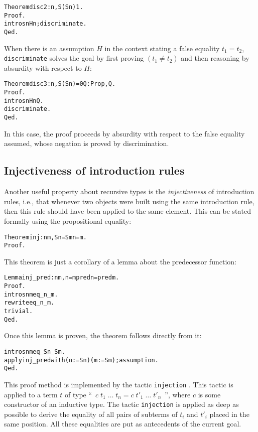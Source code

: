 \documentclass[11pt]{article}
\newcommand{\refmancite}[1]{{}}
\begin{document}
\begin{alltt}
Theorem disc2 : {\prodsym} n, S (S n) {\coqdiff} 1.
Proof.
 intros n Hn; discriminate.
Qed.
\end{alltt}

When there is an assumption $H$ in the context stating a false
equality $t_1=t_2$, \texttt{discriminate} solves the goal by first
proving $(t_1\not =t_2)$ and then reasoning by absurdity with respect
to $H$:

\begin{alltt}
Theorem disc3 : {\prodsym} n, S (S n) = 0 {\arrow} {\prodsym} Q:Prop, Q.
Proof.
 intros n Hn Q.
 discriminate.
Qed.
\end{alltt}

\noindent In this case, the proof proceeds by absurdity with respect
to the false equality assumed, whose negation is proved by
discrimination.

\subsection{Injectiveness of introduction rules}

Another useful property about recursive types is the
\textsl{injectiveness} of introduction rules, i.e., that whenever two
objects were built using the same introduction rule, then this rule
should have been applied to the same element. This can be stated
formally using the propositional equality:

\begin{alltt}
Theorem inj : {\prodsym} n m, S n = S m {\arrow} n = m.
Proof.
\end{alltt}

\noindent This theorem is just a corollary of a lemma about the
predecessor function:

\begin{alltt}
 Lemma inj_pred : {\prodsym} n m, n = m {\arrow} pred n = pred m.
 Proof.
  intros n m eq_n_m.
  rewrite eq_n_m.
  trivial.
 Qed.
\end{alltt}
\noindent Once this lemma is proven, the theorem follows directly
from it:
\begin{alltt}
 intros n m eq_Sn_Sm.
 apply inj_pred with (n:= S n) (m := S m); assumption.
Qed.
\end{alltt}

This proof method is implemented by the tactic \texttt{injection}
\refmancite{Section \ref{injection}}. This tactic is applied to
a term $t$ of type ``~$c\;{t_1}\;\dots\;t_n = c\;t'_1\;\dots\;t'_n$~'', where $c$ is some constructor of
an inductive type. The tactic \texttt{injection} is applied as deep as
possible to derive the equality of all pairs of subterms of $t_i$ and $t'_i$
placed in the same position. All these equalities are put as antecedents
of the current goal.
\end{document}
